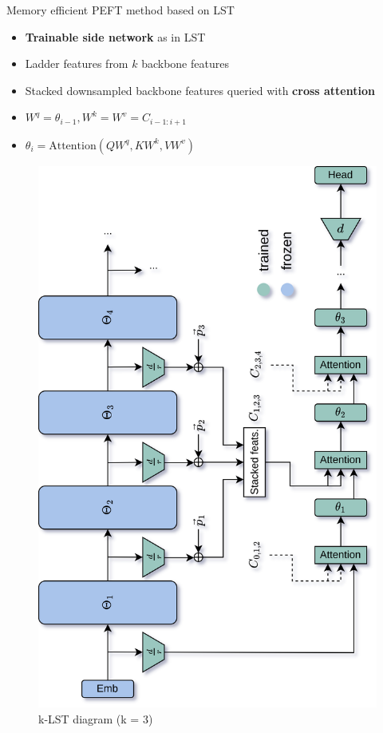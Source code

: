 Memory efficient PEFT method based on LST

\begin{itemize}[]
    \item \textbf{Trainable side network} as in LST
    \item Ladder features from $k$ backbone features
    \item Stacked downsampled backbone features queried with \textbf{cross attention}
    \item $W^q = \theta_{i-1}, W^k = W^v = C_{i-1:i+1}$
    \item $\theta_i = \text{{Attention}}(QW^q, KW^k, VW^v)$
\end{itemize}

\begin{figure}
    \centering
    \begin{adjustbox}{max width=0.63\textwidth, max height=0.63\textheight, keepaspectratio, rotate=-90, center}
        \includegraphics{assets/images/k-LST_rot.png}
    \end{adjustbox}
    \caption{k-LST diagram (k = 3)}
\end{figure}


